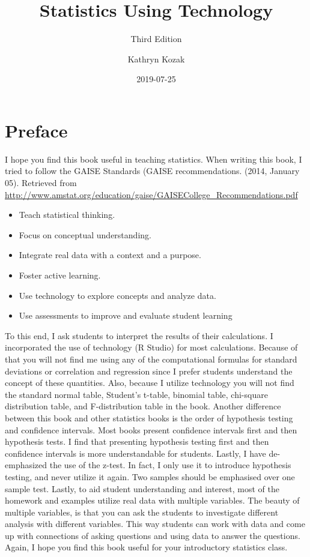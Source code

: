 \documentclass[]{book}
\title{Statistics Using Technology}
\subtitle{Third Edition}
\author{Kathryn Kozak}
\date{2019-07-25}
\providecommand{\tightlist}{%
  \setlength{\itemsep}{0pt}\setlength{\parskip}{0pt}}
\begin{document}
\maketitle

{
\setcounter{tocdepth}{1}
\tableofcontents
}
\hypertarget{preface}{%
\chapter*{Preface}\label{preface}}

I hope you find this book useful in teaching statistics. When writing this book, I tried to follow the GAISE Standards (GAISE recommendations. (2014, January 05). Retrieved from \url{http://www.amstat.org/education/gaise/GAISECollege_Recommendations.pdf}

\begin{itemize}
\tightlist
\item
  Teach statistical thinking.
\item
  Focus on conceptual understanding.
\item
  Integrate real data with a context and a purpose.
\item
  Foster active learning.
\item
  Use technology to explore concepts and analyze data.
\item
  Use assessments to improve and evaluate student learning
\end{itemize}

To this end, I ask students to interpret the results of their calculations. I incorporated the use of technology (R Studio) for most calculations. Because of that you will not find me using any of the computational formulas for standard deviations or correlation and regression since I prefer students understand the concept of these quantities. Also, because I utilize technology you will not find the standard normal table, Student's t-table, binomial table, chi-square distribution table, and F-distribution table in the book. Another difference between this book and other statistics books is the order of hypothesis testing and confidence intervals. Most books present confidence intervals first and then hypothesis tests. I find that presenting hypothesis testing first and then confidence intervals is more understandable for students. Lastly, I have de-emphasized the use of the z-test. In fact, I only use it to introduce hypothesis testing, and never utilize it again. Two samples should be emphasised over one sample test. Lastly, to aid student understanding and interest, most of the homework and examples utilize real data with multiple variables. The beauty of multiple variables, is that you can ask the students to investigate different analysis with different variables. This way students can work with data and come up with connections of asking questions and using data to answer the questions. Again, I hope you find this book useful for your introductory statistics class.
\end{document}
